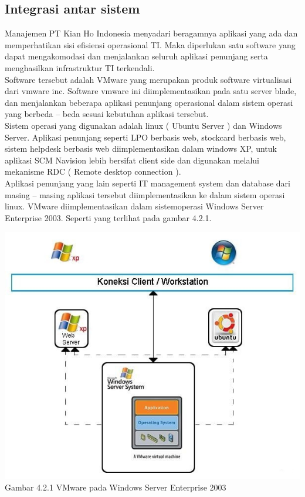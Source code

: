 \subsection{Integrasi  antar sistem}
\tab Manajemen PT Kian Ho Indonesia menyadari beragamnya aplikasi yang ada dan memperhatikan sisi efisiensi operasional TI. Maka diperlukan satu software yang dapat mengakomodasi dan menjalankan seluruh aplikasi  penunjang serta menghasilkan  infrastruktur TI terkendali.\\
Software tersebut adalah VMware yang merupakan produk  software virtualisasi  dari  vmware inc. Software vmware ini diimplementasikan pada satu server blade, dan menjalankan beberapa aplikasi penunjang operasional dalam sistem operasi yang berbeda – beda sesuai kebutuhan aplikasi tersebut.\\
Sistem operasi yang digunakan adalah linux ( Ubuntu Server ) dan Windows Server. Aplikasi penunjang seperti LPO berbasis web, stockcard berbasis web, sistem helpdesk berbasis web diimplementasikan dalam windows XP, untuk aplikasi SCM Navision lebih bersifat client side dan digunakan melalui  mekanisme RDC ( Remote desktop connection ).\\
Aplikasi penunjang yang lain seperti IT management system dan database dari masing  – masing aplikasi tersebut diimplementasikan ke dalam sistem operasi linux. VMware diimplementasikan dalam sistemoperasi Windows Server Enterprise 2003. Seperti yang terlihat pada gambar 4.2.1.
\begin{center}
\includegraphics[scale=1]{gambar421.jpg} \\
Gambar 4.2.1 VMware pada Windows Server Enterprise 2003
\end{center}
